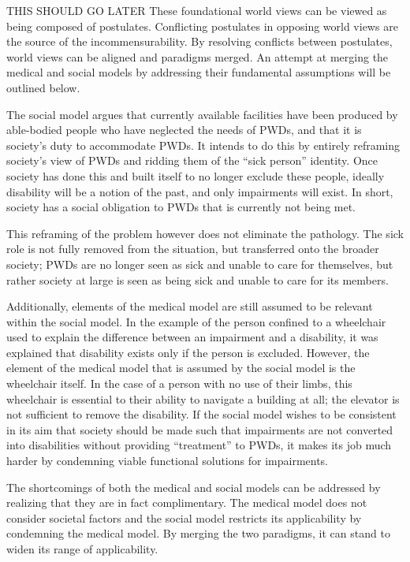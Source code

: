 \documentclass[a4paper]{article}
\begin{document}
THIS SHOULD GO LATER
These foundational world views can be viewed as being composed of postulates.
Conflicting postulates in opposing world views are the source of the
incommensurability. By resolving conflicts between postulates, world views can
be aligned and paradigms merged. An attempt at merging the medical and social
models by addressing their fundamental assumptions will be outlined below.


The social model argues that currently available facilities have been produced
by able-bodied people who have neglected the needs of PWDs, and that it is
society's duty to accommodate PWDs. It intends to do this by entirely
reframing society's view of PWDs and ridding them of the ``sick person''
identity. Once society has done this and built itself to no longer exclude
these people, ideally disability will be a notion of the past, and only
impairments will exist. In short, society has a social obligation to PWDs that
is currently not being met.

This reframing of the problem however does not eliminate the pathology. The
sick role is not fully removed from the situation, but transferred onto the
broader society; PWDs are no longer seen as sick and unable to care for
themselves, but rather society at large is seen as being sick and unable to
care for its members.

Additionally, elements of the medical model are still assumed to be relevant
within the social model. In the example of the person confined to a wheelchair
used to explain the difference between an impairment and a disability, it was
explained that disability exists only if the person is excluded. However, the
element of the medical model that is assumed by the social model is the
wheelchair itself. In the case of a person with no use of their limbs, this
wheelchair is essential to their ability to navigate a building at all; the
elevator is not sufficient to remove the disability. If the social model
wishes to be consistent in its aim that society should be made such that
impairments are not converted into disabilities without providing
``treatment'' to PWDs, it makes its job much harder by condemning viable
functional solutions for impairments.

The shortcomings of both the medical and social models can be addressed by
realizing that they are in fact complimentary. The medical model does not
consider societal factors and the social model restricts its applicability by
condemning the medical model. By merging the two paradigms, it can stand to
widen its range of applicability.
\end{document}

